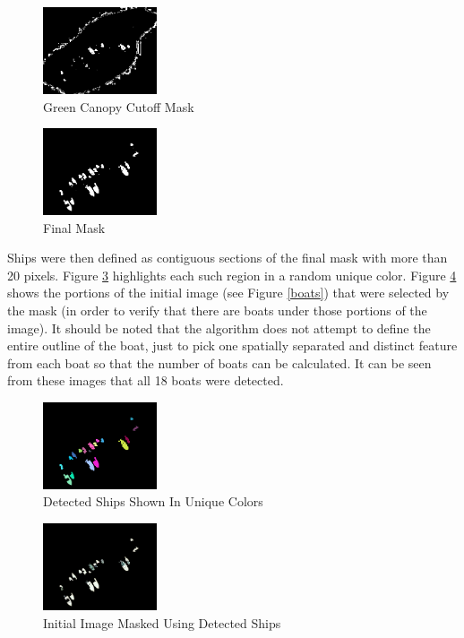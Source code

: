 \documentclass[12pt]{article}
\begin{document}
\begin{figure}
\centering
\includegraphics[width=0.30\textwidth]{mask_green_canopy.png}
\caption{Green Canopy Cutoff Mask}
\label{maskgreencanopy}
\end{figure}

\begin{figure}
\centering
\includegraphics[width=0.30\textwidth]{mask_almost_final.png}
\caption{Final Mask}
\label{maskalmostfinal}
\end{figure}

Ships were then defined as contiguous sections of the final mask with more than 20 pixels. Figure \ref{finalcolor} highlights each such region in a random unique color. Figure \ref{finalmask} shows the portions of the initial image (see Figure \ref{boats}) that were selected by the mask (in order to verify that there are boats under those portions of the image). It should be noted that the algorithm does not attempt to define the entire outline of the boat, just to pick one spatially separated and distinct feature from each boat so that the number of boats can be calculated. It can be seen from these images that all 18 boats were detected.

\begin{figure}
\centering
\includegraphics[width=0.30\textwidth]{final_color.png}
\caption{Detected Ships Shown In Unique Colors}
\label{finalcolor}
\end{figure}

\begin{figure}
\centering
\includegraphics[width=0.30\textwidth]{final_mask.png}
\caption{Initial Image Masked Using Detected Ships }
\label{finalmask}
\end{figure}
\end{document}
